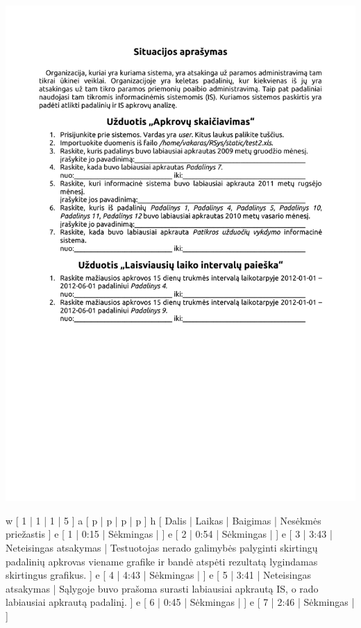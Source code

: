 \hspace{-4.0cm}\includegraphics[scale=1.00]{./4/pdfs/task.pdf}

\newpage
{}


\xtable
{
  w [ 1 | 1 | 1 | 5 ]
  a [ p | p | p | p ]
  h [ Dalis | Laikas | Baigimas | Nesėkmės priežastis ]
  e [ 1 | 0:15 | Sėkmingas | ]
  e [ 2 | 0:54 | Sėkmingas | ]
  e [ 3 | 3:43 | Neteisingas atsakymas |
    Testuotojas nerado galimybės palyginti skirtingų padalinių apkrovas
    viename grafike ir bandė atspėti rezultatą lygindamas skirtingus
    grafikus.
    ]
  e [ 4 | 4:43 | Sėkmingas | ]
  e [ 5 | 3:41 | Neteisingas atsakymas |
    Sąlygoje buvo prašoma surasti labiausiai apkrautą IS, o rado
    labiausiai apkrautą padalinį.
    ]
  e [ 6 | 0:45 | Sėkmingas | ]
  e [ 7 | 2:46 | Sėkmingas | ]
}

